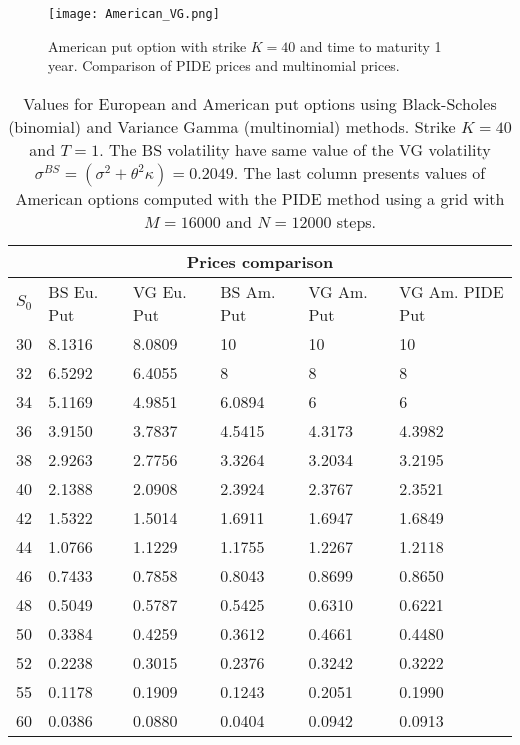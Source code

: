 \begin{figure}[ht!]
 \centering
 \texttt{[image: American\_VG.png]}
 \caption{American put option with strike $K=40$ and time to maturity 1 year. Comparison of PIDE prices and multinomial prices.}
 \label{AmVG}
\end{figure}
\begin{table}[ht]
{\begin{tabular}{llllll}
\toprule
 \multicolumn{6}{c}{Prices comparison} \\
\midrule
$S_0$ & BS Eu. Put & VG Eu. Put & BS Am. Put & VG Am. Put & VG Am. PIDE Put \\
 \midrule
  30 & 8.1316 & 8.0809 & 10     & 10     & 10 \\
  32 & 6.5292 & 6.4055 & 8      & 8      & 8 \\
  34 & 5.1169 & 4.9851 & 6.0894 & 6      & 6 \\
  36 & 3.9150 & 3.7837 & 4.5415 & 4.3173 & 4.3982 \\
  38 & 2.9263 & 2.7756 & 3.3264 & 3.2034 & 3.2195 \\
  40 & 2.1388 & 2.0908 & 2.3924 & 2.3767 & 2.3521 \\
  42 & 1.5322 & 1.5014 & 1.6911 & 1.6947 & 1.6849 \\
  44 & 1.0766 & 1.1229 & 1.1755 & 1.2267 & 1.2118 \\
  46 & 0.7433 & 0.7858 & 0.8043 & 0.8699 & 0.8650 \\
  48 & 0.5049 & 0.5787 & 0.5425 & 0.6310 & 0.6221 \\
  50 & 0.3384 & 0.4259 & 0.3612 & 0.4661 & 0.4480 \\ 
  52 & 0.2238 & 0.3015 & 0.2376 & 0.3242 & 0.3222 \\
  55 & 0.1178 & 0.1909 & 0.1243 & 0.2051 & 0.1990 \\
  60 & 0.0386 & 0.0880 & 0.0404 & 0.0942 & 0.0913 \\ 
 \bottomrule
 \end{tabular}}
  \caption{Values for European and American put options using Black-Scholes (binomial) and Variance Gamma (multinomial) methods. 
  Strike $K=40$ and $T=1$. The BS volatility have same value of the VG volatility  
  $ \sigma^{BS} = (\sigma^2 + \theta^2 \kappa) = 0.2049$. 
  The last column presents values of American options computed with the PIDE method using a grid with $M=16000$ and $N=12000$ steps. }
 \label{Option_values3}
\end{table}

